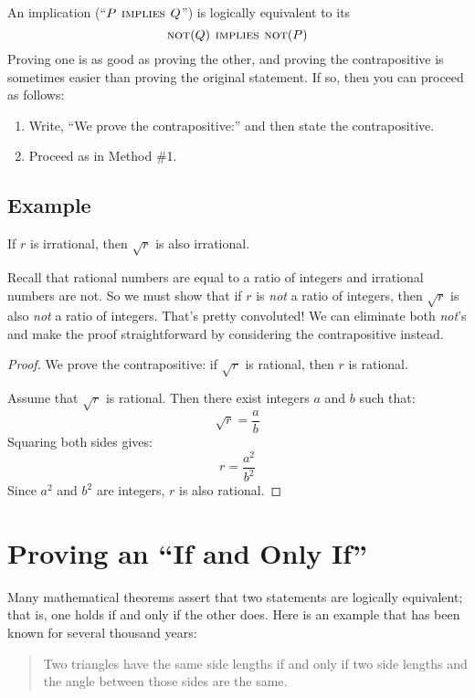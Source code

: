 An implication (``$P \mathbin{\mathrm{\textsc{\,implies\,}}} Q$'') is logically equivalent to its
\[
\mathop{\mathrm{\textsc{not}}}(Q) \mathbin{\mathrm{\textsc{\,implies\,}}} \mathop{\mathrm{\textsc{not}}}(P)
\]
Proving one is as good as proving the other, and proving the
contrapositive is sometimes easier than proving the original statement.
If so, then you can proceed as follows:
%
\begin{enumerate}
\item Write, ``We prove the contrapositive:'' and then state the
contrapositive.
\item Proceed as in Method \#1.
\end{enumerate}

\subsection*{Example}

\begin{theorem}
If $r$ is irrational, then $\sqrt{r}$ is also irrational.
\end{theorem}

Recall that rational numbers are equal to a ratio of integers and
irrational numbers are not.  So we must show that if $r$ is \textit{not} a
ratio of integers, then $\sqrt{r}$ is also \textit{not} a ratio of
integers.  That's pretty convoluted!  We can eliminate both \emph{not}'s
and make the proof straightforward by considering the contrapositive
instead.

\begin{proof}
We prove the contrapositive: if $\sqrt{r}$ is rational, then $r$ is
rational.

Assume that $\sqrt{r}$ is rational.  Then there exist integers $a$ and $b$
such that:
%
\[
\sqrt{r} = \frac{a}{b}
\]
%
Squaring both sides gives:
%
\[
r  = \frac{a^2}{b^2}
\]
%
Since $a^2$ and $b^2$ are integers, $r$ is also rational.
\end{proof}

\begin{problems}
\homeworkproblems
{}
\end{problems}

\section{Proving an ``If and Only If''}
\label{sec:prove_iff}

Many mathematical theorems assert that two statements are logically
equivalent; that is, one holds if and only if the other does.  Here is an
example that has been known for several thousand years:
\begin{quote}
Two triangles have the same side lengths if and only if two
side lengths and the angle between those sides are the same.
\end{quote}

